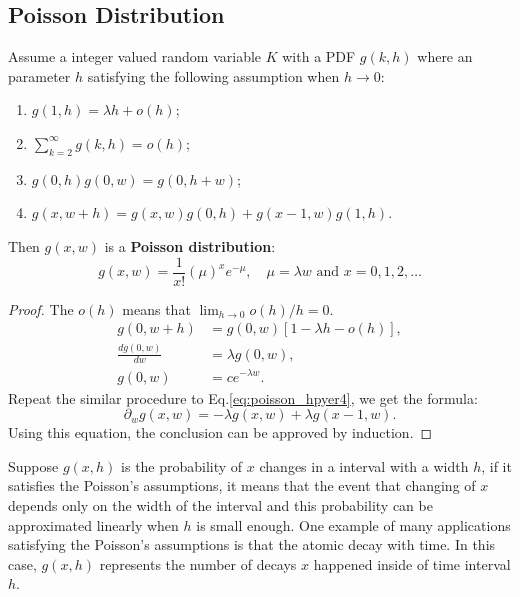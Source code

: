 \subsection{Poisson Distribution}
\begin{definition}
Assume a integer valued random variable $K$ with a PDF $g(k,h)$ where an parameter $h$ satisfying the following assumption when $h\to 0$:
\begin{enumerate}
\item $g(1,h) = \lambda h+o(h)$;
\item $\sum_{k=2}^{\infty}g(k,h)=o(h)$;
\item $g(0,h)g(0,w)=g(0,h+w)$;\label{eq:poisson_hpyer3}
\item $g(x,w+h)=g(x,w)g(0,h)+g(x-1,w)g(1,h)$.\label{eq:poisson_hpyer4}
\end{enumerate}
Then $g(x,w)$ is a \textbf{Poisson distribution}:
\begin{equation}
g(x,w)=\frac{1}{x!}(\mu)^xe^{-\mu},\quad \mu=\lambda w\,\, \text{and}\,\, x=0,1,2,\dots
\end{equation}
\end{definition}
\begin{proof}
The $o(h)$ means that $\lim_{h\to 0}o(h)/h=0$. 
\begin{equation*}
\begin{aligned}
g(0,w+h)&=g(0,w)[1-\lambda h-o(h)],\\
\frac{dg(0,w)}{dw}&=\lambda g(0,w),\\
g(0,w)&=ce^{-\lambda w}.
\end{aligned}
\end{equation*}
Repeat the similar procedure to Eq.\ref{eq:poisson_hpyer4}, we get the formula:
\begin{equation*}
\partial_wg(x,w)=-\lambda g(x,w)+\lambda g(x-1,w).
\end{equation*}
Using this equation, the conclusion can be approved by induction.
\end{proof}
Suppose $g(x,h)$ is the probability of $x$ changes in a interval with a width $h$, if it satisfies the Poisson's assumptions, it means that the event that changing of $x$ depends only on the width of the interval and this probability can be approximated linearly when $h$ is small enough. One example of many applications satisfying the Poisson's assumptions is that the atomic decay with time. In this case, $g(x,h)$ represents the number of decays $x$ happened inside of time interval $h$. 

